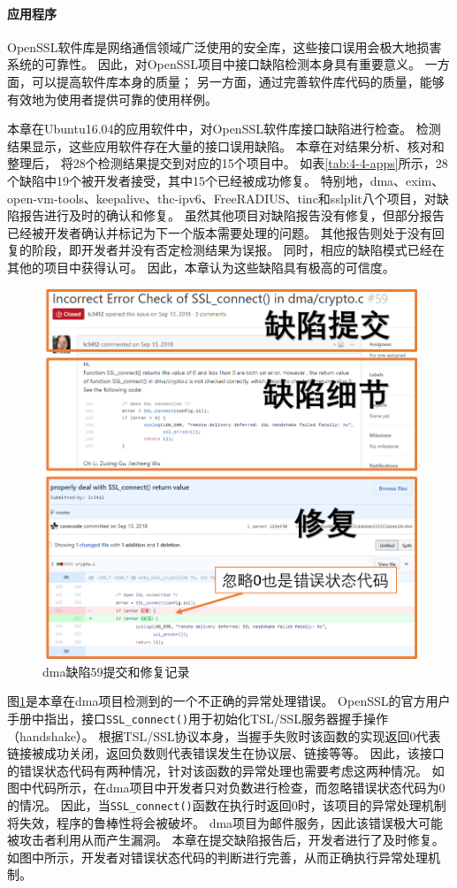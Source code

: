 \paragraph{应用程序}



OpenSSL软件库是网络通信领域广泛使用的安全库，这些接口误用会极大地损害系统的可靠性。
因此，对OpenSSL项目中接口缺陷检测本身具有重要意义。
一方面，可以提高软件库本身的质量；
另一方面，通过完善软件库代码的质量，能够有效地为使用者提供可靠的使用样例。

本章在Ubuntu16.04的应用软件中，对OpenSSL软件库接口缺陷进行检查。
检测结果显示，这些应用软件存在大量的接口误用缺陷。
本章在对结果分析、核对和整理后，
将28个检测结果提交到对应的15个项目中。
如表\ref{tab:4-4-apps}所示，28个缺陷中19个被开发者接受，其中15个已经被成功修复。
特别地，dma、exim、open-vm-tools、keepalive、thc-ipv6、FreeRADIUS、tinc和sslplit八个项目，对缺陷报告进行及时的确认和修复。
虽然其他项目对缺陷报告没有修复，但部分报告已经被开发者确认并标记为下一个版本需要处理的问题。
其他报告则处于没有回复的阶段，即开发者并没有否定检测结果为误报。
同时，相应的缺陷模式已经在其他的项目中获得认可。
因此，本章认为这些缺陷具有极高的可信度。

\begin{figure}[t]
	\centering
	\includegraphics[width=0.8\linewidth]{figures/cp4-dma-example.png}
	\caption{
		dma缺陷59提交和修复记录
	}
	\label{fig:4-4-dma-example}
\end{figure}

图\ref{fig:4-4-dma-example}是本章在dma项目检测到的一个不正确的异常处理错误。
OpenSSL的官方用户手册中指出，接口\texttt{SSL\_connect()}用于初始化TSL/SSL服务器握手操作（handshake）。
根据TSL/SSL协议本身，当握手失败时该函数的实现返回0代表链接被成功关闭，返回负数则代表错误发生在协议层、链接等等。
因此，该接口的错误状态代码有两种情况，针对该函数的异常处理也需要考虑这两种情况。
如图中代码所示，在dma项目中开发者只对负数进行检查，而忽略错误状态代码为0的情况。
因此，当\texttt{SSL\_connect()}函数在执行时返回0时，该项目的异常处理机制将失效，程序的鲁棒性将会被破坏。
dma项目为邮件服务，因此该错误极大可能被攻击者利用从而产生漏洞。
本章在提交缺陷报告后，开发者进行了及时修复。
如图中所示，开发者对错误状态代码的判断进行完善，从而正确执行异常处理机制。



